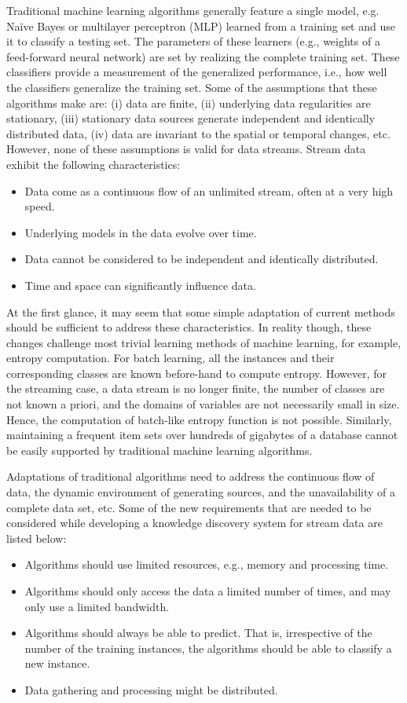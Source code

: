 Traditional machine learning algorithms generally feature a single model, e.g. Na\"ive Bayes or multilayer perceptron (MLP) learned from a training set and use it to classify a testing set. The parameters of these learners (e.g., weights of a feed-forward neural network) are set by realizing the complete training set. These classifiers provide a measurement of the generalized performance, i.e., how well the classifiers generalize the training set. Some of the assumptions that these algorithms make are: (i) data are finite, (ii) underlying data regularities are stationary, (iii) stationary data sources generate independent and identically distributed data, (iv) data are invariant to the spatial or temporal changes, etc. However, none of these assumptions is valid for data streams. Stream data exhibit the following characteristics: 
\begin{itemize}
    \item Data come as a continuous flow of an unlimited stream, often at a very high speed.
    \item Underlying models in the data evolve over time.
    \item Data cannot be considered to be independent and identically distributed.
    \item Time and space can significantly influence data.
\end{itemize}
At the first glance, it may seem that some simple adaptation of current methods should be sufficient to address these characteristics. In reality though, these changes challenge most trivial learning methods of machine learning, for example, entropy computation. For batch learning, all the instances and their corresponding classes are known before-hand to compute entropy. However, for the streaming case, a data stream is no longer finite, the number of classes are not known a priori, and the domains of variables are not necessarily small in size. Hence, the computation of batch-like entropy function is not possible. Similarly, maintaining a frequent item sets over hundreds of gigabytes of a database cannot be easily supported by traditional machine learning algorithms.

Adaptations of traditional algorithms need to address the continuous flow of data, the dynamic environment of generating sources, and the unavailability of a complete data set, etc. Some of the new requirements that are needed to be considered while developing a knowledge discovery system for stream data are listed below:
\begin{itemize}
    \item Algorithms should use limited resources, e.g., memory and processing time.
    \item Algorithms should only access the data a limited number of times, and may only use a limited bandwidth.
    \item Algorithms should always be able to predict. That is, irrespective of the number of the training instances, the algorithms should be able to classify a new instance.
    \item Data gathering and processing might be distributed.
\end{itemize}

